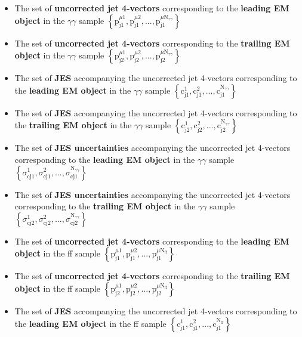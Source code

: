 \documentclass[dissertation.tex]{subfiles}
\begin{document}
\begin{itemize}
  \item The set of \textbf{uncorrected jet 4-vectors} corresponding to the \textbf{leading EM object} in the $\gamma\gamma$ sample $\left\{\mbox{p}_{\mbox{j}1}^{\mu1}, \mbox{p}_{\mbox{j}1}^{\mu2},...,\mbox{p}_{\mbox{j}1}^{\mu \mbox{N}_{\gamma\gamma}}\right\}$
  \item The set of \textbf{uncorrected jet 4-vectors} corresponding to the \textbf{trailing EM object} in the $\gamma\gamma$ sample $\left\{\mbox{p}_{\mbox{j}2}^{\mu1}, \mbox{p}_{\mbox{j}2}^{\mu2},...,\mbox{p}_{\mbox{j}2}^{\mu \mbox{N}_{\gamma\gamma}}\right\}$
  \item The set of \textbf{JES} accompanying the uncorrected jet 4-vectors corresponding to the \textbf{leading EM object} in the $\gamma\gamma$ sample $\left\{\mbox{c}_{\mbox{j}1}^{1}, \mbox{c}_{\mbox{j}1}^{2},...,\mbox{c}_{\mbox{j}1}^{\mbox{N}_{\gamma\gamma}}\right\}$
  \item The set of \textbf{JES} accompanying the uncorrected jet 4-vectors corresponding to the \textbf{trailing EM object} in the $\gamma\gamma$ sample $\left\{\mbox{c}_{\mbox{j}2}^{1}, \mbox{c}_{\mbox{j}2}^{2},...,\mbox{c}_{\mbox{j}2}^{\mbox{N}_{\gamma\gamma}}\right\}$
  \item The set of \textbf{JES uncertainties} accompanying the uncorrected jet 4-vectors corresponding to the \textbf{leading EM object} in the $\gamma\gamma$ sample $\left\{\sigma_{\mbox{cj}1}^{1}, \sigma_{\mbox{cj}1}^{2},...,\sigma_{\mbox{cj}1}^{\mbox{N}_{\gamma\gamma}}\right\}$
  \item The set of \textbf{JES uncertainties} accompanying the uncorrected jet 4-vectors corresponding to the \textbf{trailing EM object} in the $\gamma\gamma$ sample $\left\{\sigma_{\mbox{cj}2}^{1}, \sigma_{\mbox{cj}2}^{2},...,\sigma_{\mbox{cj}2}^{\mbox{N}_{\gamma\gamma}}\right\}$
  \item The set of \textbf{uncorrected jet 4-vectors} corresponding to the \textbf{leading EM object} in the ff sample $\left\{\mbox{p}_{\mbox{j}1}^{\mu1}, \mbox{p}_{\mbox{j}1}^{\mu2},...,\mbox{p}_{\mbox{j}1}^{\mu \mbox{N}_{\mbox{ff}}}\right\}$
  \item The set of \textbf{uncorrected jet 4-vectors} corresponding to the \textbf{trailing EM object} in the ff sample $\left\{\mbox{p}_{\mbox{j}2}^{\mu1}, \mbox{p}_{\mbox{j}2}^{\mu2},...,\mbox{p}_{\mbox{j}2}^{\mu \mbox{N}_{\mbox{ff}}}\right\}$
  \item The set of \textbf{JES} accompanying the uncorrected jet 4-vectors corresponding to the \textbf{leading EM object} in the ff sample $\left\{\mbox{c}_{\mbox{j}1}^{1}, \mbox{c}_{\mbox{j}1}^{2},...,\mbox{c}_{\mbox{j}1}^{\mbox{N}_{\mbox{ff}}}\right\}$

\end{itemize}
\end{document}
